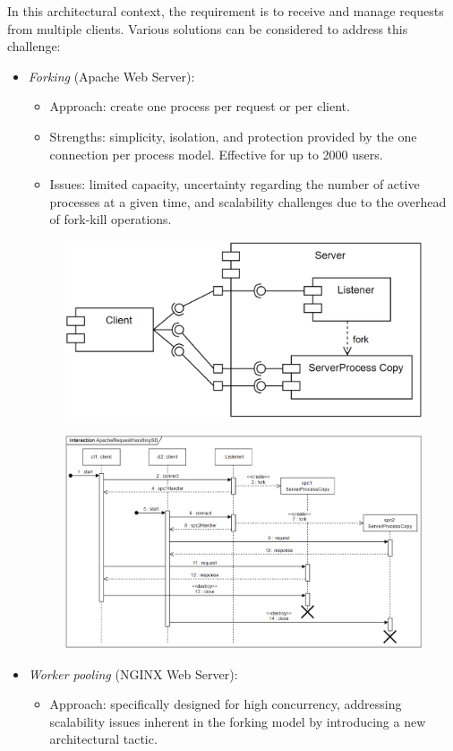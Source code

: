 In this architectural context, the requirement is to receive and manage requests from multiple clients. 
Various solutions can be considered to address this challenge:
\begin{itemize}
    \item \textit{Forking} (Apache Web Server): 
        \begin{itemize}
            \item Approach: create one process per request or per client.
            \item Strengths: simplicity, isolation, and protection provided by the one connection per process model. 
                Effective for up to 2000 users.
            \item Issues: limited capacity, uncertainty regarding the number of active processes at a given time, and scalability challenges due to the overhead of fork-kill operations.
        \end{itemize}
        \begin{figure}[H]
            \centering
            \includegraphics[width=0.5\linewidth]{images/fork.png}
        \end{figure}
        \begin{figure}[H]
            \centering
            \includegraphics[width=0.7\linewidth]{images/fork1.png}
        \end{figure}
    \item \textit{Worker pooling} (NGINX Web Server): 
        \begin{itemize}
            \item Approach: specifically designed for high concurrency, addressing scalability issues inherent in the forking model by introducing a new architectural tactic.

\end{itemize}
\end{itemize}
